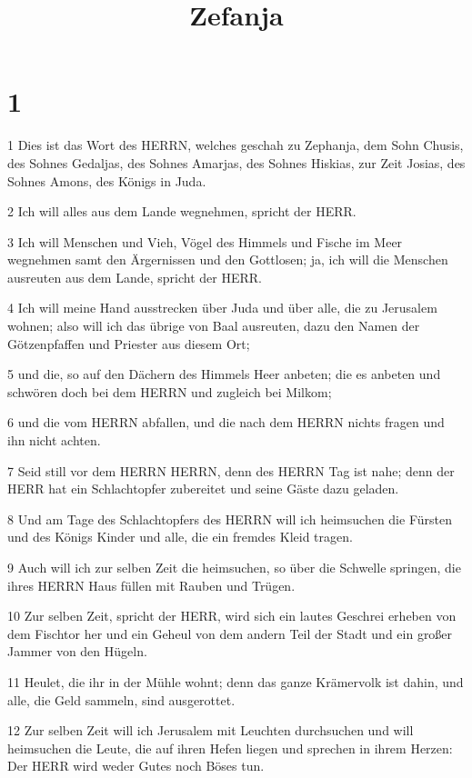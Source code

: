 

\title{Zefanja}


\chapter{1}

\par 1 Dies ist das Wort des HERRN, welches geschah zu Zephanja, dem Sohn Chusis, des Sohnes Gedaljas, des Sohnes Amarjas, des Sohnes Hiskias, zur Zeit Josias, des Sohnes Amons, des Königs in Juda.
\par 2 Ich will alles aus dem Lande wegnehmen, spricht der HERR.
\par 3 Ich will Menschen und Vieh, Vögel des Himmels und Fische im Meer wegnehmen samt den Ärgernissen und den Gottlosen; ja, ich will die Menschen ausreuten aus dem Lande, spricht der HERR.
\par 4 Ich will meine Hand ausstrecken über Juda und über alle, die zu Jerusalem wohnen; also will ich das übrige von Baal ausreuten, dazu den Namen der Götzenpfaffen und Priester aus diesem Ort;
\par 5 und die, so auf den Dächern des Himmels Heer anbeten; die es anbeten und schwören doch bei dem HERRN und zugleich bei Milkom;
\par 6 und die vom HERRN abfallen, und die nach dem HERRN nichts fragen und ihn nicht achten.
\par 7 Seid still vor dem HERRN HERRN, denn des HERRN Tag ist nahe; denn der HERR hat ein Schlachtopfer zubereitet und seine Gäste dazu geladen.
\par 8 Und am Tage des Schlachtopfers des HERRN will ich heimsuchen die Fürsten und des Königs Kinder und alle, die ein fremdes Kleid tragen.
\par 9 Auch will ich zur selben Zeit die heimsuchen, so über die Schwelle springen, die ihres HERRN Haus füllen mit Rauben und Trügen.
\par 10 Zur selben Zeit, spricht der HERR, wird sich ein lautes Geschrei erheben von dem Fischtor her und ein Geheul von dem andern Teil der Stadt und ein großer Jammer von den Hügeln.
\par 11 Heulet, die ihr in der Mühle wohnt; denn das ganze Krämervolk ist dahin, und alle, die Geld sammeln, sind ausgerottet.
\par 12 Zur selben Zeit will ich Jerusalem mit Leuchten durchsuchen und will heimsuchen die Leute, die auf ihren Hefen liegen und sprechen in ihrem Herzen: Der HERR wird weder Gutes noch Böses tun.
